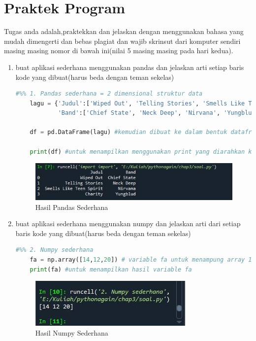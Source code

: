 \section{Praktek Program}
Tugas anda adalah,praktekkan dan jelaskan dengan menggunakan bahasa yang mudah dimengerti dan bebas plagiat dan wajib skrinsut dari komputer sendiri masing masing nomor di bawah ini(nilai 5 masing masing pada hari kedua).

\begin{enumerate}
\item buat aplikasi sederhana menggunakan pandas dan jelaskan arti setiap baris kode yang dibuat(harus beda dengan teman sekelas)
\begin{lstlisting}[language=Python]
    #%% 1. Pandas sederhana = 2 dimensional struktur data
    lagu = {'Judul':['Wiped Out', 'Telling Stories', 'Smells Like Teen Spirit', 'Charity'],
            'Band':['Chief State', 'Neck Deep', 'Nirvana', 'Yungblud']} # dictionary yang menampung key dan value nya berupa judul dan band
    
    df = pd.DataFrame(lagu) #kemudian dibuat ke dalam bentuk dataframe yang tampung kedalam sebuah variable dengan nama df
    
    print(df) #untuk menampilkan menggunakan print yang diarahkan ke variable df tadi
\end{lstlisting}
\begin{figure}[!htbp]
    \centering
    \includegraphics[scale=0.5]{figures/pandasSederhana.JPG}
	\caption{Hasil Pandas Sederhana}
\end{figure}

\item buat aplikasi sederhana menggunakan numpy dan jelaskan arti dari setiap baris kode yang dibuat(harus beda dengan teman sekelas)
\begin{lstlisting}[language=Python]
    #%% 2. Numpy sederhana
    fa = np.array([14,12,20]) # variable fa untuk menampung array 1 dimensi 
    print(fa) #untuk menampilkan hasil variable fa 
\end{lstlisting}
\begin{figure}[!htbp]
    \centering
    \includegraphics[scale=0.5]{figures/numpySederhana.JPG}
	\caption{Hasil Numpy Sederhana}
\end{figure}


\end{enumerate}
